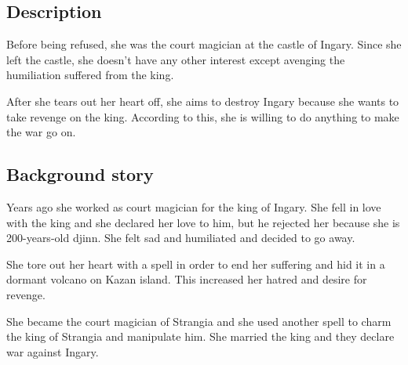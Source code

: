 \subsection{Description}
Before being refused, she was the court magician at the castle of Ingary. Since she left the castle, she doesn't have any other interest except avenging the humiliation suffered from the king.

After she tears out her heart off, she aims to destroy Ingary because she wants to take revenge on the king. According to this, she is willing to do anything to make the war go on.

\subsection{Background story}
Years ago she worked as court magician for the king of Ingary. She fell in love with the king and she declared her love to him, but he rejected her because she is 200-years-old djinn. She felt sad and humiliated and decided to go away.

She tore out her heart with a spell in order to end her suffering and hid it in a dormant volcano on Kazan island. This increased her hatred and desire for revenge.

She became the court magician of Strangia and she used another spell to charm the king of Strangia and manipulate him. She married the king and they declare war against Ingary.
